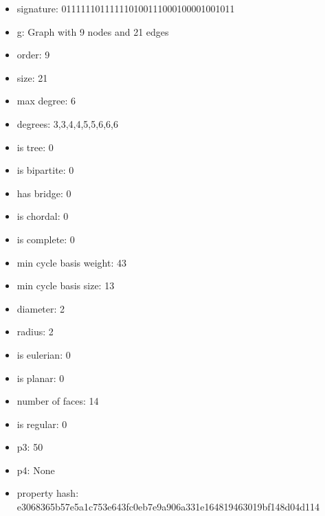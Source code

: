 \newpage
\begin{figure}
\end{figure}
\begin{itemize}
\item signature: 011111101111110100111000100001001011
\item g: Graph with 9 nodes and 21 edges
\item order: 9
\item size: 21
\item max degree: 6
\item degrees: 3,3,4,4,5,5,6,6,6
\item is tree: 0
\item is bipartite: 0
\item has bridge: 0
\item is chordal: 0
\item is complete: 0
\item min cycle basis weight: 43
\item min cycle basis size: 13
\item diameter: 2
\item radius: 2
\item is eulerian: 0
\item is planar: 0
\item number of faces: 14
\item is regular: 0
\item p3: 50
\item p4: None
\item property hash: e3068365b57e5a1c753e643fc0eb7e9a906a331e164819463019bf148d04d114
\end{itemize}
